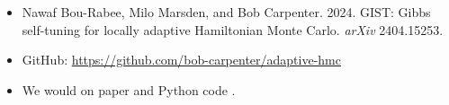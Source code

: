 \documentclass[10pt]{report}
\begin{document}
\begin{itemize}
\item Nawaf Bou-Rabee, Milo Marsden, and Bob Carpenter. 2024. GIST: Gibbs
self-tuning for locally adaptive Hamiltonian Monte
Carlo. \textit{arXiv} 2404.15253.
\item GitHub: \url{https://github.com/bob-carpenter/adaptive-hmc}
\vfill
\item We would  on paper and
  Python code .
\end{itemize}
\end{document}

